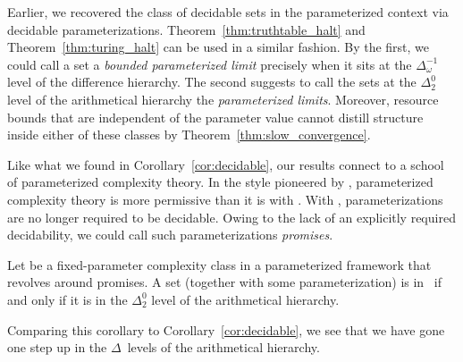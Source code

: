 Earlier, we recovered the class of decidable sets in the parameterized context via decidable parameterizations.
Theorem~\ref{thm:truthtable_halt} and Theorem~\ref{thm:turing_halt} can be used in a similar fashion.
By the first, we could call a set a \emph{bounded parameterized limit} precisely when it sits at the $\Delta^{-1}_\omega$ level of the difference hierarchy.
The second suggests to call the sets at the $\Delta^0_2$ level of the arithmetical hierarchy the \emph{parameterized limits}.
Moreover, resource bounds that are independent of the parameter value cannot distill structure inside either of these classes by Theorem~\ref{thm:slow_convergence}.

Like what we found in Corollary~\ref{cor:decidable}, our results connect to a school of parameterized complexity theory.
In the style pioneered by \textcite{downey1999parameterized}, parameterized complexity theory is more permissive than it is with \textcite{flum2006parameterized}.
With \citeauthor{downey1999parameterized}, parameterizations are no longer required to be decidable.
Owing to the lack of an explicitly required decidability, we could call such parameterizations \emph{promises}.
\begin{corollary}
  Let  be a fixed-parameter complexity class in a parameterized framework that revolves around promises.
  A set (together with some parameterization) is in~ if and only if it is in the $\Delta^0_2$ level of the arithmetical hierarchy.
\end{corollary}

Comparing this corollary to Corollary~\ref{cor:decidable}, we see that we have gone one step up in the $\Delta$~levels of the arithmetical hierarchy.

